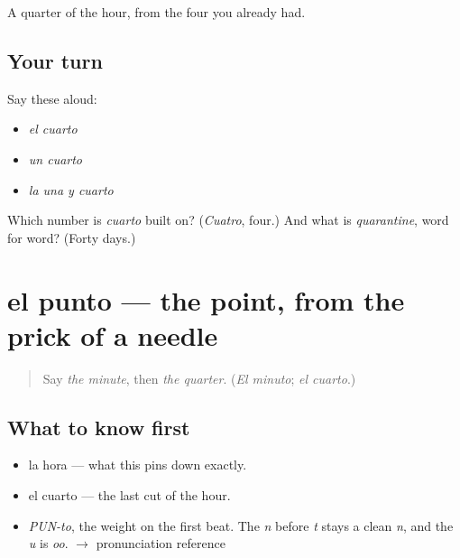 \begin{grammarlens}[title={What you've built}]
A quarter of the hour, from the four you already had.
\end{grammarlens}

\subsection*{Your turn}
Say these aloud:

\begin{itemize}
\raggedright
  \item \emph{el cuarto}
  \item \emph{un cuarto}
  \item \emph{la una y cuarto}
\end{itemize}

\begin{tcolorbox}[breakable,colback=teal!4,colframe=teal!35!black,title={Before you move on}]
Which number is \emph{cuarto} built on? (\emph{Cuatro}, four.) And what is \emph{quarantine}, word for word? (Forty days.)
\end{tcolorbox}
\section[el punto]{el punto — the point, from the prick of a needle}

\label{lesson:ES-C342-punto}



\begin{quote}
Say \emph{the minute}, then \emph{the quarter}. (\emph{El minuto}; \emph{el cuarto}.)
\end{quote}

\subsection*{What to know first}
\begin{itemize}
\raggedright
  \item la hora — what this pins down exactly.
  \item el cuarto — the last cut of the hour.
\end{itemize}

\begin{sounds}
\begin{itemize}
\raggedright
  \item \emph{PUN-to}, the weight on the first beat. The \emph{n} before \emph{t} stays a clean \emph{n}, and the \emph{u} is \emph{oo}. $\to$ pronunciation reference
\end{itemize}
\end{sounds}


